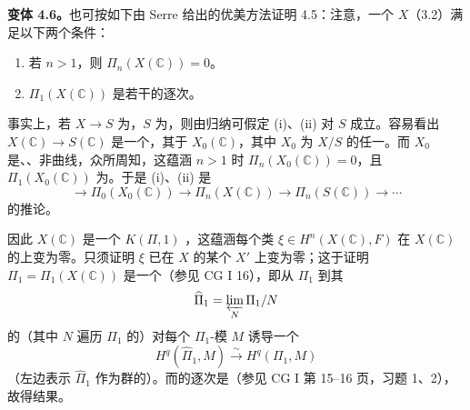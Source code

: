 \textbf{变体 4.6。}也可按如下由 Serre 给出的优美方法证明 4.5：注意，一个 $X$（3.2）满足以下两个条件：
\begin{enumerate}
\item[(i)] 若 $n>1$，则 $\Pi_n(X(\mathbb C))=0$。
\item[(ii)] $\Pi_1(X(\mathbb C))$ 是若干的逐次。
\end{enumerate}
事实上，若 $X\to S$ 为，$S$ 为，则由归纳可假定 (i)、(ii) 对 $S$ 成立。容易看出 $X(\mathbb C)\to S(\mathbb C)$ 是一个，其于 $X_0(\mathbb C)$，其中 $X_0$ 为 $X/S$ 的任一。而 $X_0$ 是、、非曲线，众所周知，这蕴涵 $n>1$ 时 $\Pi_n(X_0(\mathbb C))=0$，且 $\Pi_1(X_0(\mathbb C))$ 为。于是 (i)、(ii) 是
\[
 \longrightarrow\Pi_0(X_0(\mathbb C))\longrightarrow\Pi_n(X(\mathbb C))
 \longrightarrow\Pi_n(S(\mathbb C))\longrightarrow\cdots
\]
的推论。

因此 $X(\mathbb C)$ 是一个 $K(\Pi,1)$ ，这蕴涵每个类 $\xi\in H^n(X(\mathbb C),F)$ 在 $X(\mathbb C)$ 的上变为零。只须证明 $\xi$ 已在 $X$ 的某个 $X'$ 上变为零；这于证明 $\Pi_1=\Pi_1(X(\mathbb C))$ 是一个（参见 CG I 16），即从 $\Pi_1$ 到其
\[
 \widehat\Pi_1=\varprojlim_N\Pi_1/N
\]
的（其中 $N$ 遍历 $\Pi_1$ 的）对每个 $\Pi_1$-模 $M$ 诱导一个
\[
 H^q(\widehat\Pi_1,M)\xrightarrow{\sim}H^q(\Pi_1,M)
\]
（左边表示 $\widehat\Pi_1$ 作为群的）。而的逐次是（参见 CG I 第 15--16 页，习题 1、2），故得结果。

